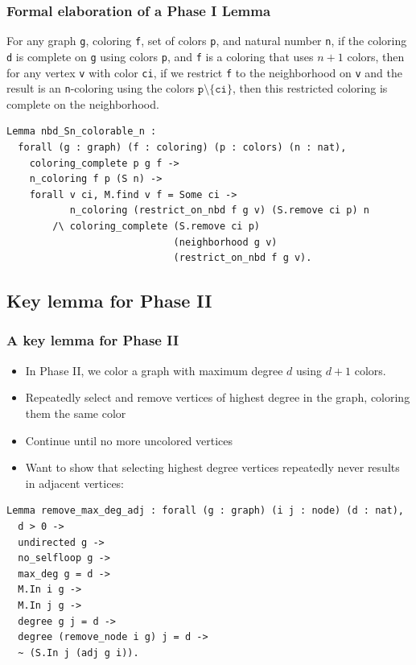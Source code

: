 \documentclass{beamer}
\begin{document}
\begin{frame}[fragile]
\frametitle{Formal elaboration of a Phase I Lemma}
For any graph \texttt{g}, coloring \texttt{f}, set of colors
\texttt{p}, and natural number \texttt{n}, if the coloring \texttt{d}
is complete on \texttt{g} using colors \texttt{p}, and \texttt{f} is a
coloring that uses \(n + 1\) colors, then for any vertex \texttt{v}
with color \texttt{ci}, if we restrict \texttt{f} to the neighborhood
on \texttt{v} and the result is an \texttt{n}-coloring using the
colors \(\texttt{p}\setminus\{\texttt{ci}\}\), then this restricted
coloring is complete on the neighborhood.
\begin{verbatim}
Lemma nbd_Sn_colorable_n :
  forall (g : graph) (f : coloring) (p : colors) (n : nat),
    coloring_complete p g f ->
    n_coloring f p (S n) ->
    forall v ci, M.find v f = Some ci ->
           n_coloring (restrict_on_nbd f g v) (S.remove ci p) n
        /\ coloring_complete (S.remove ci p)
                             (neighborhood g v)
                             (restrict_on_nbd f g v).
\end{verbatim}
\end{frame}

\subsection{Key lemma for Phase II}
\begin{frame}[fragile]
\frametitle{A key lemma for Phase II}
\begin{itemize}
\item In Phase II, we color a graph with maximum degree $d$ using
  $d+1$ colors.
\item Repeatedly select and remove vertices of highest degree in the
  graph, coloring them the same color
\item Continue until no more uncolored vertices
\item Want to show that selecting highest degree vertices repeatedly
  never results in adjacent vertices:
\end{itemize}
\begin{verbatim}
Lemma remove_max_deg_adj : forall (g : graph) (i j : node) (d : nat),
  d > 0 ->
  undirected g ->
  no_selfloop g ->
  max_deg g = d ->
  M.In i g ->
  M.In j g ->
  degree g j = d ->
  degree (remove_node i g) j = d ->
  ~ (S.In j (adj g i)).
\end{verbatim}
\end{frame}
\end{document}
